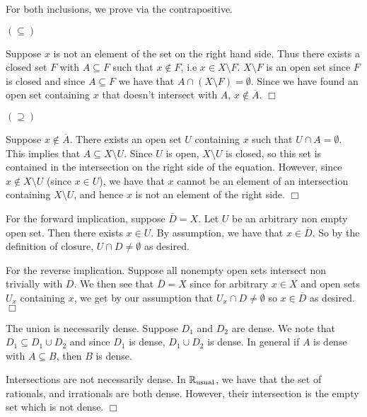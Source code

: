 \documentclass{article}
\begin{document}
 {
    For both inclusions, we prove via the contrapositive.

    $(\subseteq)$

    Suppose $x$ is not an element of the set on the right hand side. Thus there exists a closed set $F$ with $A\subseteq F$ such that $x\not\in F$, i.e $x\in X\setminus F$. $X\setminus F$ is an open set since $F$ is closed and since $A\subseteq F$ we have that $A\cap (X\setminus F) = \emptyset$. Since we have found an open set containing $x$ that doesn't intersect with $A$, $x\not\in \overline{A}$. $\Box$

    $(\supseteq)$

    Suppose $x\not\in \overline{A}$. There exists an open set $U$ containing $x$ such that $U\cap A = \emptyset$. This implies that $A\subseteq X\setminus U$. Since $U$ is open, $X\setminus U$ is closed, so this set is contained in the intersection on the right side of the equation. However, since $x\not\in X\setminus U$ (since $x\in U$), we have that $x$ cannot be an element of an intersection containing $X\setminus U$, and hence $x$ is not an element of the right side. $\Box$ 
}
 {
    For the forward implication, suppose $\overline{D} = X$. Let $U$ be an arbitrary non empty open set. Then there exists $x\in U$. By assumption, we have that $x\in \overline{D}$. So by the definition of closure, $U\cap D\neq\emptyset$ as desired.

    For the reverse implication. Suppose all nonempty open sets intersect non trivially with $D$. We then see that $\overline{D} = X$ since for arbitrary $x\in X$ and open sets $U_{x}$ containing $x$, we get by our assumption that $U_{x}\cap D\neq \emptyset$ so  $x\in \overline{D}$ as desired. $\Box$
}

 {
    The union is necessarily dense. Suppose $D_{1}$ and $D_{2}$ are dense. We note that $D_{1}\subseteq D_{1}\cup D_{2}$ and since $D_{1}$ is dense, $D_{1}\cup D_{2}$ is dense. In general if $A$ is dense with $A\subseteq B$, then $B$ is dense.

    Intersections are not necessarily dense. In $\mathbb{R}_{\text{usual}}$, we have that the set of rationals, and irrationals are both dense. However, their intersection is the empty set which is not dense. $\Box$
}
\end{document}
